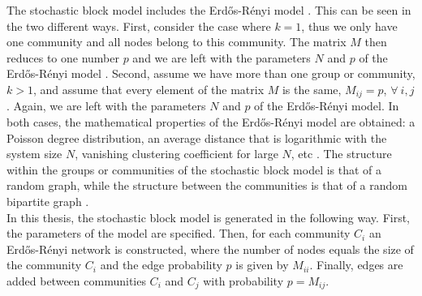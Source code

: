 \documentclass[11 pt , letterpaper , twoside , openright]{book}
\begin{document}
The stochastic block model includes the Erd\H{o}s-R\'{e}nyi model \cite{Clauset2017}. This can be seen in the two different ways. First, consider the case where $k = 1$, thus we only have one community and all nodes belong to this community. The matrix $M$ then reduces to one number $p$ and we are left with the parameters $N$ and $p$ of the Erd\H{o}s-R\'{e}nyi model \cite{Clauset2017}. Second, assume we have more than one group or community, $k > 1$, and assume that every element of the matrix $M$ is the same, $M_{ij} = p$, $\forall \ i, j$ \cite{Clauset2017}. Again, we are left with the parameters $N$ and $p$ of the Erd\H{o}s-R\'{e}nyi model. In both cases, the mathematical properties of the Erd\H{o}s-R\'{e}nyi model are obtained: a Poisson degree distribution, an average distance that is logarithmic with the system size $N$, vanishing clustering coefficient for large $N$, etc \cite{Clauset2017}. The structure within the groups or communities of the stochastic block model is that of a random graph, while the structure between the communities is that of a random bipartite graph \cite{Clauset2017}.\\
\newline
In this thesis, the stochastic block model is generated in the following way. First, the parameters of the model are specified. Then, for each community $C_i$ an Erd\H{o}s-R\'{e}nyi network is constructed, where the number of nodes equals the size of the community $C_i$ and the edge probability $p$ is given by $M_{ii}$. Finally, edges are added between communities $C_i$ and $C_j$ with probability $p = M_{ij}$.\\
\newline
\end{document}

